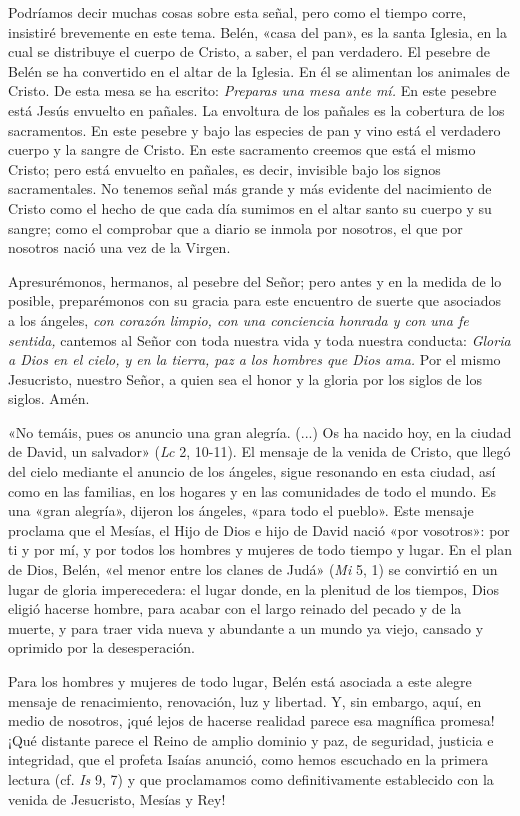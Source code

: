 \documentclass[]{article}
\begin{document}
Podríamos decir muchas cosas sobre esta señal, pero como el tiempo
corre, insistiré brevemente en este tema. Belén, «casa del pan», es la
santa Iglesia, en la cual se distribuye el cuerpo de Cristo, a saber, el
pan verdadero. El pesebre de Belén se ha convertido en el altar de la
Iglesia. En él se alimentan los animales de Cristo. De esta mesa se ha
escrito: \emph{Preparas una mesa ante mí.} En este pesebre está Jesús
envuelto en pañales. La envoltura de los pañales es la cobertura de los
sacramentos. En este pesebre y bajo las especies de pan y vino está el
verdadero cuerpo y la sangre de Cristo. En este sacramento creemos que
está el mismo Cristo; pero está envuelto en pañales, es decir, invisible
bajo los signos sacramentales. No tenemos señal más grande y más
evidente del nacimiento de Cristo como el hecho de que cada día sumimos
en el altar santo su cuerpo y su sangre; como el comprobar que a diario
se inmola por nosotros, el que por nosotros nació una vez de la Virgen.

Apresurémonos, hermanos, al pesebre del Señor; pero antes y en la medida
de lo posible, preparémonos con su gracia para este encuentro de suerte
que asociados a los ángeles, \emph{con corazón limpio, con una
conciencia honrada y con una fe sentida,} cantemos al Señor con toda
nuestra vida y toda nuestra conducta: \emph{Gloria a Dios en el cielo, y
en la tierra, paz a los hombres que Dios ama.} Por el mismo Jesucristo,
nuestro Señor, a quien sea el honor y la gloria por los siglos de los
siglos. Amén.

«No temáis, pues os anuncio una gran alegría. (...) Os ha nacido hoy, en
la ciudad de David, un salvador» (\emph{Lc} 2, 10-11). El mensaje de la
venida de Cristo, que llegó del cielo mediante el anuncio de los
ángeles, sigue resonando en esta ciudad, así como en las familias, en
los hogares y en las comunidades de todo el mundo. Es una «gran
alegría», dijeron los ángeles, «para todo el pueblo». Este mensaje
proclama que el Mesías, el Hijo de Dios e hijo de David nació «por
vosotros»: por ti y por mí, y por todos los hombres y mujeres de todo
tiempo y lugar. En el plan de Dios, Belén, «el menor entre los clanes de
Judá» (\emph{Mi} 5, 1) se convirtió en un lugar de gloria imperecedera:
el lugar donde, en la plenitud de los tiempos, Dios eligió hacerse
hombre, para acabar con el largo reinado del pecado y de la muerte, y
para traer vida nueva y abundante a un mundo ya viejo, cansado y
oprimido por la desesperación.

Para los hombres y mujeres de todo lugar, Belén está asociada a este
alegre mensaje de renacimiento, renovación, luz y libertad. Y, sin
embargo, aquí, en medio de nosotros, ¡qué lejos de hacerse realidad
parece esa magnífica promesa! ¡Qué distante parece el Reino de amplio
dominio y paz, de seguridad, justicia e integridad, que el profeta
Isaías anunció, como hemos escuchado en la primera lectura (cf.
\emph{Is} 9, 7) y que proclamamos como definitivamente establecido con
la venida de Jesucristo, Mesías y Rey!
\end{document}
